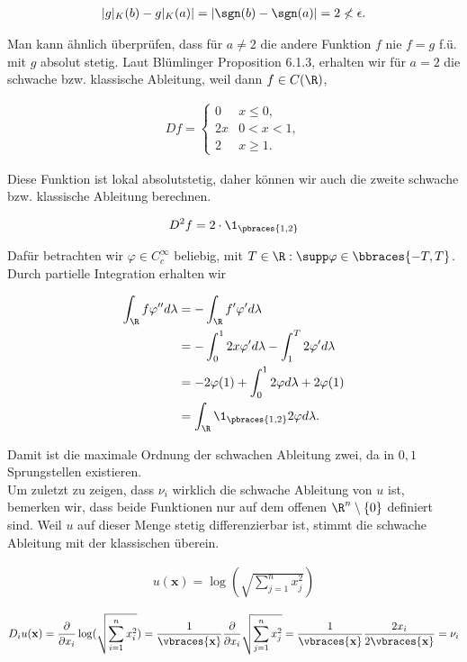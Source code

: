 \begin{solution}
\begin{align*}
  |g|_K(b) - g|_K(a)| = |\sgn(b) - \sgn(a)| = 2 \nless \epsilon.
\end{align*}

Man kann ähnlich überprüfen, dass für $a \neq 2$ die andere Funktion $f$ nie $f = g$ f.ü. mit $g$ absolut stetig. Laut Blümlinger Proposition 6.1.3, erhalten wir für $a = 2$ die schwache bzw. klassische Ableitung, weil dann $f \in C(\R)$,

\begin{align*}
  Df =
  \begin{cases}
    0  & x \leq 0,  \\
    2x & 0 < x < 1, \\
    2  & x \geq 1.
  \end{cases}
\end{align*}

Diese Funktion ist lokal absolutstetig, daher können wir auch die zweite schwache bzw. klassische Ableitung berechnen.

\begin{align*}
  D^2 f = 2 \cdot \1_{\pbraces{1, 2}}
\end{align*}

Dafür betrachten wir $\varphi \in C^{\infty}_c$ beliebig, mit $T \in \R: \supp \varphi \in \bbraces{-T, T}$. Durch partielle
Integration erhalten wir

\begin{align*}
    \int_\R f \varphi^{\prime \prime} d \lambda
    & = - \int_\R f^\prime \varphi^\prime d \lambda \\
    & = - \int_0^1 2x \varphi^\prime d \lambda
        - \int_1^T 2 \varphi^\prime d \lambda \\
    & = - 2 \varphi(1)
        + \int_0^1 2 \varphi d \lambda
        + 2 \varphi(1) \\
    & = \int_\R \1_{\pbraces{1, 2}} 2 \varphi d \lambda.
\end{align*}

Damit ist die maximale Ordnung der schwachen Ableitung zwei, da in $0, 1$ Sprungstellen existieren. \\

Um zuletzt zu zeigen, dass $\nu_i$ wirklich die schwache Ableitung von $u$ ist, bemerken wir, dass beide Funktionen nur auf dem offenen $\R^n \setminus \{ 0 \}$ definiert sind. Weil $u$ auf dieser Menge stetig differenzierbar ist, stimmt die schwache Ableitung mit der klassischen überein.

\begin{align*}
    u(\textbf{x}) = \log(\sqrt{\sum_{j=1}^n x_j^2})
\end{align*}

\begin{align*}
    D_i u(\textbf{x})
  = \frac{\partial}{\partial x_i} \log(\sqrt{\sum_{i=1}^n x_i^2})
  = \frac{1}{\vbraces{\textbf{x}}} \frac{\partial}{\partial x_i}
    \sqrt{\sum_{j=1}^n x_j^2}
  = \frac{1}{\vbraces{\textbf{x}}} \frac{2x_i}{2\vbraces{\textbf{x}}}
  = \nu_i
\end{align*}
\end{solution}
